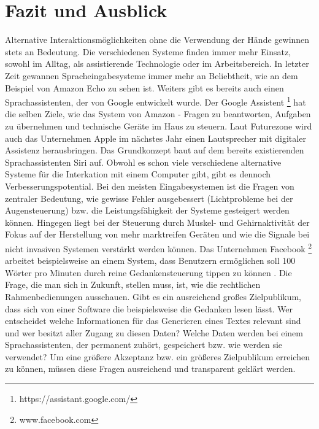 \chapter{Fazit und Ausblick}

Alternative Interaktionsmöglichkeiten ohne die Verwendung der Hände gewinnen stets an Bedeutung. Die verschiedenen Systeme finden immer mehr Einsatz, sowohl im Alltag, als assistierende Technologie oder im Arbeitsbereich.
\newline \newline
In letzter Zeit gewannen Spracheingabesysteme immer mehr an Beliebtheit, wie an dem Beispiel von Amazon Echo zu sehen ist. Weiters gibt es bereits auch einen Sprachassistenten, der von Google entwickelt wurde. Der Google Assistent%
\footnote{https://assistant.google.com/}
%
hat die selben Ziele, wie das System von Amazon - Fragen zu beantworten, Aufgaben zu übernehmen und technische Geräte im Haus zu steuern. Laut Futurezone \cite{Futurezone} wird auch das Unternehmen Apple im nächstes Jahr einen Lautsprecher mit digitaler Assistenz herausbringen. Das Grundkonzept baut auf dem bereits existierenden Sprachassistenten Siri auf.
\newline \newline
Obwohl es schon viele verschiedene alternative Systeme für die Interkation mit einem Computer gibt, gibt es dennoch Verbesserungspotential. Bei den meisten Eingabesystemen ist die Fragen von zentraler Bedeutung, wie gewisse Fehler ausgebessert (\zB Lichtprobleme bei der Augensteuerung) bzw. die Leistungsfähigkeit der Systeme gesteigert werden können. Hingegen liegt bei der Steuerung durch Muskel- und Gehirnaktivität der Fokus auf der Herstellung von mehr marktreifen Geräten und wie die Signale bei nicht invasiven Systemen verstärkt werden können. Das Unternehmen Facebook%
\footnote{www.facebook.com}
%
arbeitet beispielsweise an einem System, dass Benutzern ermöglichen soll 100 Wörter pro Minuten durch reine Gedankensteuerung tippen zu können \cite{Facebook}.
\newline \newline
Die Frage, die man sich in Zukunft, stellen muss, ist, wie die rechtlichen Rahmenbedienungen ausschauen. Gibt es ein ausreichend großes Zielpublikum, dass sich von einer Software die beispielsweise die Gedanken lesen lässt. Wer entscheidet welche Informationen für das Generieren eines Textes relevant sind und wer besitzt aller Zugang zu diesen Daten? Welche Daten werden bei einem Sprachassistenten, der permanent zuhört, gespeichert bzw. wie werden sie verwendet? Um eine größere Akzeptanz bzw. ein größeres Zielpublikum erreichen zu können, müssen diese Fragen ausreichend und transparent geklärt werden.




